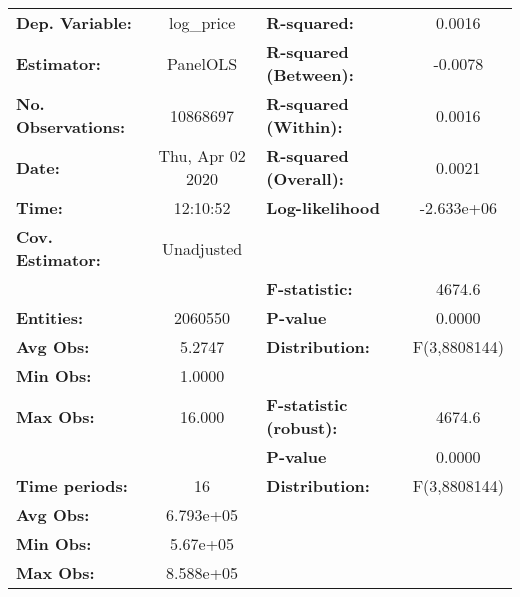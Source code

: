 \documentclass{report}
\begin{document}
\begin{center}
\begin{tabular}{lclc}
\toprule
\textbf{Dep. Variable:}        &     log\_price     & \textbf{  R-squared:         }   &      0.0016      \\
\textbf{Estimator:}            &      PanelOLS      & \textbf{  R-squared (Between):}  &     -0.0078      \\
\textbf{No. Observations:}     &      10868697      & \textbf{  R-squared (Within):}   &      0.0016      \\
\textbf{Date:}                 &  Thu, Apr 02 2020  & \textbf{  R-squared (Overall):}  &      0.0021      \\
\textbf{Time:}                 &      12:10:52      & \textbf{  Log-likelihood     }   &    -2.633e+06    \\
\textbf{Cov. Estimator:}       &     Unadjusted     & \textbf{                     }   &                  \\
\textbf{}                      &                    & \textbf{  F-statistic:       }   &      4674.6      \\
\textbf{Entities:}             &      2060550       & \textbf{  P-value            }   &      0.0000      \\
\textbf{Avg Obs:}              &       5.2747       & \textbf{  Distribution:      }   &   F(3,8808144)   \\
\textbf{Min Obs:}              &       1.0000       & \textbf{                     }   &                  \\
\textbf{Max Obs:}              &       16.000       & \textbf{  F-statistic (robust):} &      4674.6      \\
\textbf{}                      &                    & \textbf{  P-value            }   &      0.0000      \\
\textbf{Time periods:}         &         16         & \textbf{  Distribution:      }   &   F(3,8808144)   \\
\textbf{Avg Obs:}              &     6.793e+05      & \textbf{                     }   &                  \\
\textbf{Min Obs:}              &      5.67e+05      & \textbf{                     }   &                  \\
\textbf{Max Obs:}              &     8.588e+05      & \textbf{                     }   &                  \\
\bottomrule
\end{tabular}
\begin{tabular}{lcccccc}

\end{tabular}
\end{center}
\end{document}
